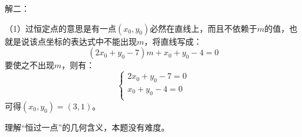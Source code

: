 解二：

（1）过恒定点的意思是有一点$\left( x_0,y_0 \right) $必然在直线上，而且不依赖于$m$的值，也就是说该点坐标的表达式中不能出现$m$，将直线写成：
\[
\left( 2x_0+y_0-7 \right) m+x_0+y_0-4=0
\]
要使之不出现$m$，则有：
\[
\begin{cases}
	2x_0+y_0-7=0\\
	x_0+y_0-4=0\\
\end{cases}
\]
可得$\left( x_0,y_0 \right) =\left( 3,1 \right) $。

\begin{tcolorbox}
理解“恒过一点”的几何含义，本题没有难度。
\end{tcolorbox}





